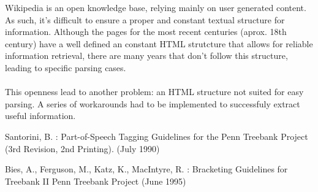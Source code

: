 \documentclass{llncs}
\begin{document}
Wikipedia is an open knowledge base, relying mainly on user generated content. As such, it's difficult to ensure a proper and constant textual structure for information. Although the pages for the most recent centuries (aprox. 18th century) have a well defined an constant HTML strutcture that allows for reliable information retrieval, there are many years that don't follow this structure, leading to specific parsing cases.\\
\ \\
This openness lead to another problem: an HTML structure not suited for easy parsing. A series of workarounds had to be implemented to successfuly extract useful information.

%
%
\begin{thebibliography}{}
%
Santorini, B. :
Part-of-Speech Tagging Guidelines for the
Penn Treebank Project (3rd Revision, 2nd Printing).
(July 1990)

Bies, A., Ferguson, M., Katz, K., MacIntyre, R. :
Bracketing Guidelines for Treebank II
Penn Treebank Project
(June 1995)

\end{thebibliography}
\clearpage
{} %
\renewcommand{\indexname}{Author Index}
\printindex
\clearpage
{} %
\renewcommand{\indexname}{Subject Index}

\end{document}
